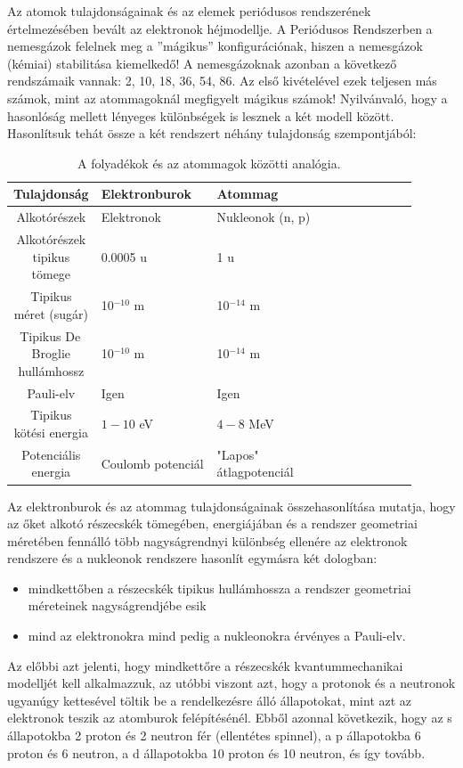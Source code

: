\documentclass[../main.tex]{subfiles}
\begin{document}
Az atomok tulajdonságainak és az elemek periódusos rendszerének értelmezésében bevált az elektronok héjmodellje. A Periódusos Rendszerben a nemesgázok felelnek meg
a ”mágikus” konfigurációnak, hiszen a nemesgázok (kémiai) stabilitása kiemelkedő! A
nemesgázoknak azonban a következő rendszámaik vannak: 2, 10, 18, 36, 54, 86. Az első
kivételével ezek teljesen más számok, mint az atommagoknál megfigyelt mágikus számok!
Nyilvánvaló, hogy a hasonlóság mellett lényeges különbségek is lesznek a két modell között. Hasonlítsuk tehát össze a két rendszert néhány tulajdonság szempontjából:
\begin{table}[H]
    \centering
    \begin{tabular}{|c|p{0.30\linewidth}|p{0.30\linewidth}|p{0.30\linewidth}|}
        \hline
        \textbf{Tulajdonság} & \textbf{Elektronburok} & \textbf{Atommag} \\
        \hline
        Alkotórészek & Elektronok & Nukleonok (n, p) \\
        \hline
        Alkotórészek tipikus tömege & 0.0005 u & 1 u \\
        \hline
        Tipikus méret (sugár) & 10$^{-10}$ m & 10$^{-14}$ m \\
        \hline
        Tipikus De\,Broglie hullámhossz & 10$^{-10}$ m & 10$^{-14}$ m \\
        \hline
        Pauli-elv & Igen & Igen \\
        \hline
        Tipikus kötési energia & $1-10$ eV & $4-8$ MeV \\
        \hline
        Potenciális energia & Coulomb potenciál & "Lapos" átlagpotenciál \\
        \hline
    \end{tabular}
    \caption{A folyadékok és az atommagok közötti analógia.}
\end{table}
Az elektronburok és az atommag tulajdonságainak összehasonlítása mutatja, hogy
az őket alkotó részecskék tömegében, energiájában és a rendszer geometriai méretében
fennálló több nagyságrendnyi különbség ellenére az elektronok rendszere és a nukleonok
rendszere hasonlít egymásra két dologban:
\begin{itemize}
    \item mindkettőben a részecskék tipikus hullámhossza a rendszer geometriai méreteinek nagyságrendjébe esik
    \item mind az elektronokra mind pedig a nukleonokra érvényes a Pauli-elv.
\end{itemize}
Az előbbi azt jelenti, hogy mindkettőre a részecskék kvantummechanikai modelljét kell
alkalmazzuk, az utóbbi viszont azt, hogy a protonok és a neutronok ugyanúgy kettesével
töltik be a rendelkezésre álló állapotokat, mint azt az elektronok teszik az atomburok
felépítésénél. Ebből azonnal következik, hogy az s állapotokba 2 proton és 2 neutron fér
(ellentétes spinnel), a p állapotokba 6 proton és 6 neutron, a d állapotokba 10 proton és
10 neutron, és így tovább.
\end{document}
